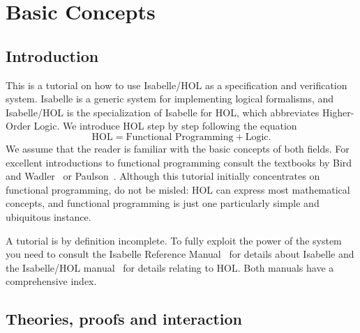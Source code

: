 \chapter{Basic Concepts}

\section{Introduction}

This is a tutorial on how to use Isabelle/HOL as a specification and
verification system. Isabelle is a generic system for implementing logical
formalisms, and Isabelle/HOL is the specialization of Isabelle for
HOL, which abbreviates Higher-Order Logic. We introduce HOL step by step
following the equation
\[ \mbox{HOL} = \mbox{Functional Programming} + \mbox{Logic}. \]
We assume that the reader is familiar with the basic concepts of both fields.
For excellent introductions to functional programming consult the textbooks
by Bird and Wadler~\cite{Bird-Wadler} or Paulson~\cite{paulson-ml2}.  Although
this tutorial initially concentrates on functional programming, do not be
misled: HOL can express most mathematical concepts, and functional
programming is just one particularly simple and ubiquitous instance.

A tutorial is by definition incomplete. To fully exploit the power of the
system you need to consult the Isabelle Reference Manual~\cite{isabelle-ref}
for details about Isabelle and the Isabelle/HOL manual~\cite{isabelle-HOL}
for details relating to HOL. Both manuals have a comprehensive index.

\section{Theories, proofs and interaction}
\label{sec:Basic:Theories}

